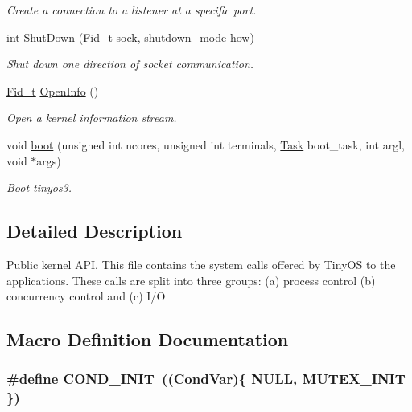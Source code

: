 \begin{DoxyCompactItemize}
\begin{DoxyCompactList}\small\item\em Create a connection to a listener at a specific port. \end{DoxyCompactList}\item 
int \hyperlink{group__syscalls_ga61d49d63d8c0f9fc0917cc1bda6fdfcb}{Shut\-Down} (\hyperlink{group__syscalls_ga5097222c5f0da97d92d4712359abc38f}{Fid\-\_\-t} sock, \hyperlink{group__syscalls_ga9eb10a0a72ca3149140272e9344a272b}{shutdown\-\_\-mode} how)
\begin{DoxyCompactList}\small\item\em Shut down one direction of socket communication. \end{DoxyCompactList}\item 
\hyperlink{group__syscalls_ga5097222c5f0da97d92d4712359abc38f}{Fid\-\_\-t} \hyperlink{group__syscalls_gaf326b11574cdc84a9e21b9d860076821}{Open\-Info} ()
\begin{DoxyCompactList}\small\item\em Open a kernel information stream. \end{DoxyCompactList}\item 
void \hyperlink{group__syscalls_ga31d9ee7df9665928617a9f9c0cc6d361}{boot} (unsigned int ncores, unsigned int terminals, \hyperlink{group__syscalls_ga0c7678964128d7fccc9ce98528494f4a}{Task} boot\-\_\-task, int argl, void $\ast$args)
\begin{DoxyCompactList}\small\item\em Boot tinyos3. \end{DoxyCompactList}\end{DoxyCompactItemize}


\subsection{Detailed Description}
Public kernel A\-P\-I. This file contains the system calls offered by Tiny\-O\-S to the applications. These calls are split into three groups\-: (a) process control (b) concurrency control and (c) I/\-O 

\subsection{Macro Definition Documentation}
\hypertarget{group__syscalls_ga6a7055a466bff255172e05f6ec82d792}{
\subsubsection[{C\-O\-N\-D\-\_\-\-I\-N\-I\-T}]{\setlength{\rightskip}{0pt plus 5cm}\#define C\-O\-N\-D\-\_\-\-I\-N\-I\-T~(({\bf Cond\-Var})\{ N\-U\-L\-L, {\bf M\-U\-T\-E\-X\-\_\-\-I\-N\-I\-T} \})}}\label{group__syscalls_ga6a7055a466bff255172e05f6ec82d792}


